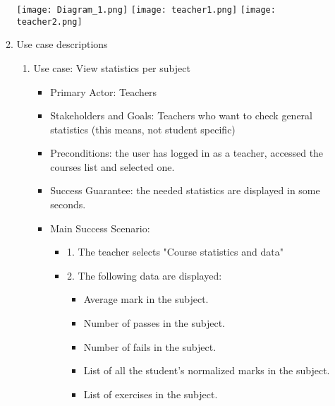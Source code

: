 \documentclass{article}
\begin{document}
\begin{enumerate}
\begin{enumerate}
		\texttt{[image: Diagram\_1.png]}
		\texttt{[image: teacher1.png]}
		\texttt{[image: teacher2.png]}
		\\
		\item{Use case descriptions}
		\begin{enumerate}
			\item{Use case: View statistics per subject}
			\begin{itemize}
				\item Primary Actor: Teachers
				\item Stakeholders and Goals: Teachers who want to check general statistics (this means, not student specific) 
				\item Preconditions: the user has logged in as a teacher, accessed the courses list and selected one.
				\item Success Guarantee: the needed statistics are displayed in some seconds.
				\item Main Success Scenario: 
					\begin{itemize}
					\item 1. The teacher selects "Course statistics and data"
					\item 2. The following data are displayed:
						\begin{itemize}
							\item Average mark in the subject.
							\item Number of passes in the subject.
							\item Number of fails in the subject.
							\item List of all the student's normalized marks in the subject.
							\item List of exercises in the subject.
						\end{itemize}
				

\end{itemize}
\end{itemize}
\end{enumerate}
\end{enumerate}
\end{enumerate}
\end{document}
